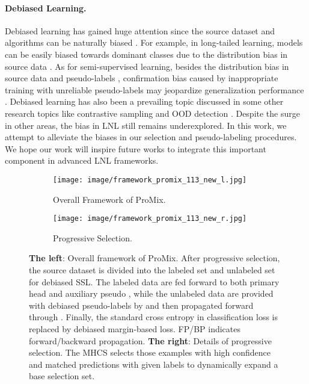 \documentclass{article}
\begin{document}
\paragraph{Debiased Learning.}
Debiased learning has gained huge attention since the source dataset and algorithms can be naturally biased \cite{DBLP:conf/cvpr/KimKKKK19,DBLP:conf/nips/NamCALS20}. For example, in long-tailed learning, models can be easily biased towards dominant classes due to the distribution bias in source data \cite{DBLP:journals/corr/abs-2110-04596}. 
As for semi-supervised learning, besides the distribution bias in source data and pseudo-labels \cite{DBLP:conf/cvpr/WangWLY22}, confirmation bias caused by inappropriate training with unreliable pseudo-labels may jeopardize generalization performance \cite{https://doi.org/10.48550/arxiv.2202.07136}. 
Debiased learning has also been a prevailing topic discussed in some other research topics like contrastive sampling \cite{DBLP:conf/nips/ChuangRL0J20} and OOD detection \cite{DBLP:conf/aaai/MingYL22}. 
Despite the surge in other areas, the bias in LNL still remains underexplored. In this work, we attempt to alleviate the biases in our selection and pseudo-labeling procedures. We hope our work will inspire future works to integrate this important component in advanced LNL frameworks. 



\begin{figure*}[t]
     \centering
     \begin{subfigure}[][][t]{0.621\linewidth}
         \texttt{[image: image/framework\_promix\_113\_new\_l.jpg]}
\caption{Overall Framework of ProMix.}
     \end{subfigure}
\begin{subfigure}[][][t]{0.3\linewidth}
         \texttt{[image: image/framework\_promix\_113\_new\_r.jpg]}
         \caption{Progressive Selection.}
     \end{subfigure}
     \caption{\textbf{The left}: Overall framework of ProMix. After progressive selection, the source dataset is divided into the labeled set and unlabeled set for debiased SSL. The labeled data are fed forward to both primary head  and auxiliary pseudo , while the unlabeled data are provided with debiased pseudo-labels by  and then propagated forward through . Finally, the standard cross entropy in classification loss is replaced by debiased margin-based loss. FP/BP indicates forward/backward propagation. 
     \textbf{The right}: Details of progressive selection. The MHCS selects those examples with high confidence and matched predictions with given labels to dynamically expand a base selection set.
     }
     \label{fig:framework}
\end{figure*}
\end{document}
